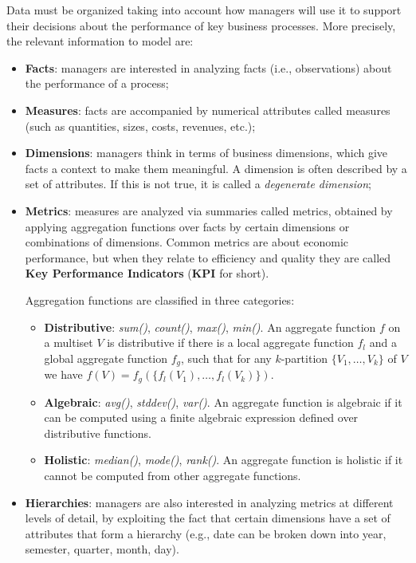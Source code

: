 Data must be organized taking into account how managers will use it to support their decisions about the performance of key business processes. More precisely, the relevant information to model are:
\begin{itemize}
    \item \textbf{Facts}: managers are interested in analyzing facts (i.e., observations) about the performance of a process;
    \item \textbf{Measures}: facts are accompanied by numerical attributes called measures (such as quantities, sizes, costs, revenues, etc.);
    \item \textbf{Dimensions}: managers think in terms of business dimensions, which give facts a context to make them meaningful. A dimension is often described by a set of attributes. If this is not true, it is called a \textit{degenerate dimension};
    \item \textbf{Metrics}: measures are analyzed via summaries called metrics, obtained by applying aggregation functions over facts by certain dimensions or combinations of dimensions.  Common metrics are about economic performance, but when they relate to efficiency and quality they are called \textbf{Key Performance Indicators} (\textbf{KPI} for short).
    
    Aggregation functions are classified in three categories:
    \begin{itemize}
        \item \textbf{Distributive}: \textit{sum()}, \textit{count()}, \textit{max()}, \textit{min()}. An aggregate function $f$ on a multiset $V$ is distributive if there is a local aggregate function $f_l$ and a global aggregate function $f_g$, such that for any $k$-partition $\{V_1, \ldots, V_k\}$ of $V$ we have $f(V) = f_g(\{f_l(V_1), \ldots, f_l(V_k)\})$.
        \item \textbf{Algebraic}: \textit{avg()}, \textit{stddev()}, \textit{var()}. An aggregate function is algebraic if it can be computed using a finite algebraic expression defined over distributive functions.
        \item \textbf{Holistic}: \textit{median()}, \textit{mode()}, \textit{rank()}. An aggregate function is holistic if it cannot be computed from other aggregate functions.
    \end{itemize}
    \item \textbf{Hierarchies}: managers are also interested in analyzing metrics at different levels of detail, by exploiting the fact that certain dimensions have a set of attributes that form a hierarchy (e.g., date can be broken down into year, semester, quarter, month, day).
\end{itemize}
